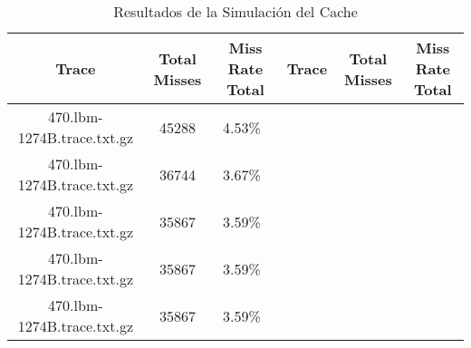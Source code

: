 \begin{table}[H]
\centering
\begin{tabular}{|c|c|c|c|c|c|}
\hline
Trace & Total Misses & Miss Rate Total & Trace & Total Misses & Miss Rate Total \\
\hline
470.lbm-1274B.trace.txt.gz & 45288 & 4.53\%\ & & & \\\hline
470.lbm-1274B.trace.txt.gz & 36744 & 3.67\%\ & & & \\\hline
470.lbm-1274B.trace.txt.gz & 35867 & 3.59\%\ & & & \\\hline
470.lbm-1274B.trace.txt.gz & 35867 & 3.59\%\ & & & \\\hline
470.lbm-1274B.trace.txt.gz & 35867 & 3.59\%\ & & & \\\hline
\hline
\end{tabular}
\caption{Resultados de la Simulación del Cache}
\label{tab:cache_results}
\end{table}